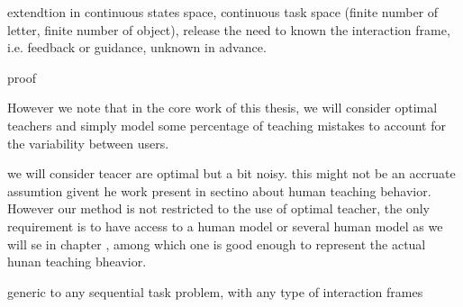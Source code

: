 extendtion in continuous states space, continuous task space (finite number of letter, finite number of object), release the need to known the interaction frame, i.e. feedback or guidance, unknown in advance.

proof

However we note that in the core work of this thesis, we will consider optimal teachers and simply model some percentage of teaching mistakes to account for the variability between users.


we will consider teacer are optimal but a bit noisy. this might not be an accruate assumtion givent he work present in sectino about human teaching behavior. However our method is not restricted to the use of optimal teacher, the only requirement is to have access to a human model or several human model as we will se in chapter , among which one is good enough to represent the actual hunan teaching bheavior.



generic to any sequential task problem, with any type of interaction frames


